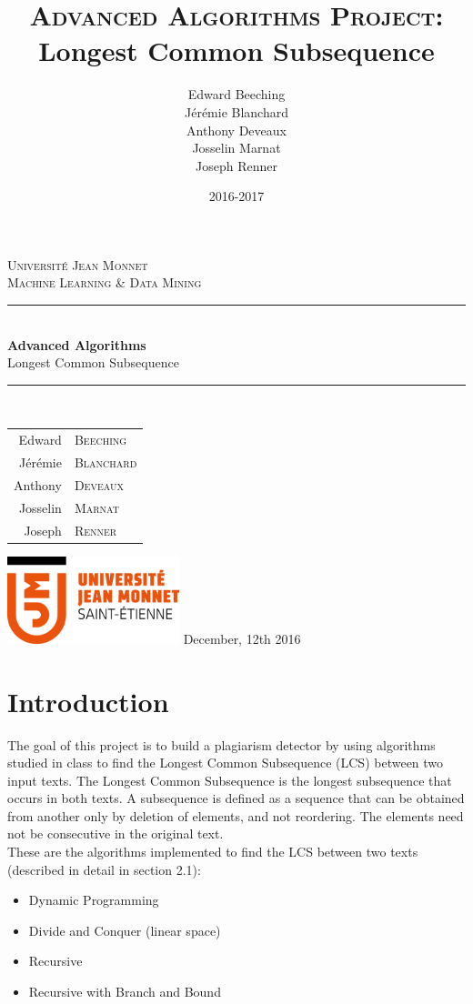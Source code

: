\documentclass[a4paper,12pt]{article}
\title{\textsc{Advanced Algorithms Project:}\\Longest Common Subsequence}
\author{Edward Beeching\\Jérémie Blanchard\\Anthony Deveaux\\Josselin Marnat\\Joseph Renner}
\date{2016-2017}
\newcommand{\HRule}{\rule{\linewidth}{0.5mm}}
\begin{document}
	\thispagestyle{empty}
	\vspace{2cm}
	\begin{center}
		\LARGE{\textsc{Université Jean Monnet}}\\[2cm]
		\Large{\textsc{Machine Learning \& Data Mining}} \\[2cm]
		\HRule \\[0.5cm]
		{ \huge \bfseries Advanced Algorithms}\\[0.4cm]
		Longest Common Subsequence\\
		\HRule \\[1.5cm]
		\normalsize
		\begin{tabular}{r|l}
			Edward		& \textsc{Beeching}\\
			Jérémie		& \textsc{Blanchard}\\
			Anthony		& \textsc{Deveaux}\\
			Josselin	& \textsc{Marnat}\\
			Joseph		& \textsc{Renner}	
		\end{tabular}
		\vfill
		\includegraphics[width=5cm]{include/logoUJM-2016.png}
		\vfill
		December, 12th 2016
	\end{center}
	\newpage

	\renewcommand\contentsname{\begin{center}Table of Contents\end{center}}
	\tableofcontents

	\newpage
	\pagestyle{fancy}

	\section{Introduction}
		The goal of this project is to build a plagiarism detector by using algorithms studied in class to find the Longest Common Subsequence (LCS) between two input texts. The Longest Common Subsequence is the longest subsequence that occurs in both texts. A subsequence is defined as a sequence that can be obtained from another only by deletion of elements, and not reordering. The elements need not be consecutive in the original text. \\
		These are the algorithms implemented to find the LCS between two texts (described in detail in section 2.1):
		\begin{itemize}
			\item Dynamic Programming
			\item Divide and Conquer (linear space)
			\item Recursive
			\item Recursive with Branch and Bound
		\end{itemize}
\end{document}
